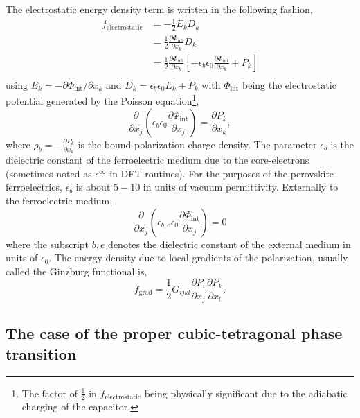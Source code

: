 \documentclass[22pt]{article} %
\begin{document}
%
The electrostatic energy density term is written in the following fashion, 
%
\begin{align}\nonumber
f_\mathrm{electrostatic} &= - \frac{1}{2} E_k D_k\\ \nonumber
&= \frac{1}{2} \frac{\partial \Phi_\mathrm{int}}{\partial x_k} D_k\\ \nonumber
&= \frac{1}{2} \frac{\partial \Phi_\mathrm{int}}{\partial x_k} \left[- \epsilon_b \epsilon_0 \frac{\partial \Phi_\mathrm{int}}{\partial x_k}  + P_k\right]\\ \nonumber
\end{align}
%
using $E_k = - \partial \Phi_\mathrm{int} / \partial x_k$ and $D_k = \epsilon_b \epsilon_0 E_k + P_k$ with $\Phi_\mathrm{int}$ being the electrostatic potential generated by the Poisson equation\footnote[4]{The factor of $\frac{1}{2}$ in $f_\mathrm{electrostatic}$ being physically significant due to the adiabatic charging of the capacitor.},
%
$$\frac{\partial}{\partial x_j} \left( \epsilon_b \epsilon_0 \frac{\partial \Phi_\mathrm{int}}{\partial x_j}\right) = \frac{\partial P_k}{\partial x_k},$$
%
where $\rho_b = - \frac{\partial P_k}{\partial x_k}$ is the bound polarization charge density.
%
The parameter $\epsilon_b$ is the dielectric constant of the ferroelectric medium due to the core-electrons (sometimes noted as $\epsilon^\infty$ in DFT routines).
%
For the purposes of the perovskite-ferroelectrics, $\epsilon_b$ is about $5-10$ in units of vacuum permittivity. 
%
Externally to the ferroelectric medium, 
%
$$\frac{\partial}{\partial x_j} \left( \epsilon_{b,e} \epsilon_0 \frac{\partial \Phi_\mathrm{int}}{\partial x_j}\right) = 0$$
%
where the subscript $b,e$ denotes the dielectric constant of the external medium in units of $\epsilon_0$.
%
The energy density due to local gradients of the polarization, usually called the Ginzburg functional is, 
%
$$f_\mathrm{grad} = \frac{1}{2} G_{ijkl} \frac{\partial P_i}{\partial x_j} \frac{\partial P_k}{\partial x_l}.$$
%


%
\subsection{The case of the proper cubic-tetragonal phase transition}
%

%
\end{document}
